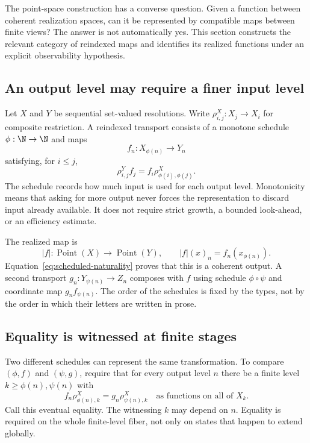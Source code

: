 \label{sec:observation}
The point-space construction has a converse question. Given a function between coherent realization spaces, can it be represented by compatible maps between finite views? The answer is not automatically yes. This section constructs the relevant category of reindexed maps and identifies its realized functions under an explicit observability hypothesis.

\subsection{An output level may require a finer input level}
Let \(X\) and \(Y\) be sequential set-valued resolutions. Write \(\rho^X_{i,j}:X_j\to X_i\) for composite restriction. A reindexed transport consists of a monotone schedule \(\phi:\N\to\N\) and maps
\[
 f_n:X_{\phi(n)}\longrightarrow Y_n
\]
satisfying, for \(i\le j\),
\begin{equation}\label{eq:scheduled-naturality}
 \rho^Y_{i,j}f_j=f_i\rho^X_{\phi(i),\phi(j)}.
\end{equation}
The schedule records how much input is used for each output level. Monotonicity means that asking for more output never forces the representation to discard input already available. It does not require strict growth, a bounded look-ahead, or an efficiency estimate.

The realized map is
\[
 |f|:\operatorname{Point}(X)\to\operatorname{Point}(Y),\qquad
 |f|(x)_n=f_n(x_{\phi(n)}).
\]
Equation~\eqref{eq:scheduled-naturality} proves that this is a coherent output. A second transport \(g_n:Y_{\psi(n)}\to Z_n\) composes with \(f\) using schedule \(\phi\circ\psi\) and coordinate map \(g_n f_{\psi(n)}\). The order of the schedules is fixed by the types, not by the order in which their letters are written in prose.

\subsection{Equality is witnessed at finite stages}
Two different schedules can represent the same transformation. To compare \((\phi,f)\) and \((\psi,g)\), require that for every output level \(n\) there be a finite level \(k\ge\phi(n),\psi(n)\) with
\begin{equation}\label{eq:eventual-equality}
 f_n\rho^X_{\phi(n),k}=g_n\rho^X_{\psi(n),k}
 \quad\text{as functions on all of }X_k.
\end{equation}
Call this eventual equality. The witnessing \(k\) may depend on \(n\). Equality is required on the whole finite-level fiber, not only on states that happen to extend globally.

